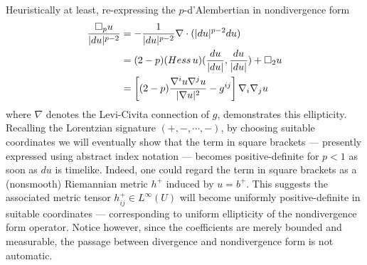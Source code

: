 \documentclass[12pt]{amsart}
\newcommand{\Hess}{\mathop{\rm Hess}}
\begin{document}
Heuristically at least, re-expressing the $p$-d'Alembertian in nondivergence form
\begin{align}
\begin{split}
\frac{\square_p u}{|du|^{p-2}}
&= -\frac1{|du|^{p-2}}\nabla \cdot (|du|^{p-2} du) 
\\&= (2-p)(\Hess u)(\frac{du}{|du|},\frac{du}{|du|}) +\square_2 u
\\&= \left[(2-p) \frac{\nabla^i u \nabla^j u}{|\nabla u|^2} - g^{ij} \right]\nabla_i\nabla_j u 
\label{nondivergence}
\end{split}
\end{align}
where $\nabla$ denotes the Levi-Civita connection of $g$, demonstrates this ellipticity.  Recalling the Lorentzian signature $(+, -, \cdots, -)$, by choosing suitable coordinates
we will eventually show that the term in square brackets 
--- presently expressed using abstract index notation \cite{Wald84} ---
becomes positive-definite for $p<1$ as soon as $du$ is timelike.  Indeed,  one could regard the term in square brackets as a (nonsmooth) Riemannian metric $h^+$ 
induced by $u=b^+$. 
 This suggests the associated metric tensor $h_{ij}^+ \in L^\infty(U)$ will become uniformly positive-definite in suitable coordinates --- 
 corresponding to uniform ellipticity of the nondivergence form 
 operator.   Notice however, since the coefficients are merely bounded and measurable,  the passage between divergence and nondivergence form is not automatic.
\end{document}
